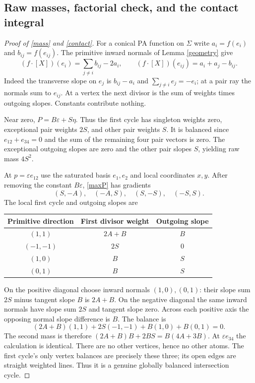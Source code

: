 \documentclass[11pt]{article}
\newcommand{\eps}{\varepsilon}
\begin{document}
\subsection{Raw masses, factorial check, and the contact integral}
\begin{proof}[Proof of \eqref{mass} and \eqref{contact}]
For a conical PA function on $\Sigma$ write $a_i=f(e_i)$ and $b_{ij}=f(e_{ij})$. The primitive inward normals of Lemma \ref{geometry} give
\begin{equation}\label{fanweights}
 (f\cdot[X])(e_i)=\sum_{j\ne i}b_{ij}-2a_i,\qquad
 (f\cdot[X])(e_{ij})=a_i+a_j-b_{ij}.
\end{equation}
Indeed the transverse slope on $e_j$ is $b_{ij}-a_i$ and $\sum_{j\ne i}e_j=-e_i$; at a pair ray the normals sum to $e_{ij}$. At a vertex the next divisor is the sum of weights times outgoing slopes. Constants contribute nothing.

Near zero, $P=B\eps+S\eta$. Thus the first cycle has singleton weights zero, exceptional pair weights $2S$, and other pair weights $S$. It is balanced since $e_{12}+e_{34}=0$ and the sum of the remaining four pair vectors is zero. The exceptional outgoing slopes are zero and the other pair slopes $S$, yielding raw mass $4S^2$.

At $p=\eps e_{12}$ use the saturated basis $e_1,e_2$ and local coordinates $x,y$. After removing the constant $B\eps$, \eqref{maxP} has gradients
\[(S,-A),\quad(-A,S),\quad(S,-S),\quad(-S,S).\]
The local first cycle and outgoing slopes are
\begin{center}
\begin{tabular}{ccc}\toprule
Primitive direction&First divisor weight&Outgoing slope\\\midrule
$(1,1)$&$2A+B$&$B$\\
$(-1,-1)$&$2S$&$0$\\
$(1,0)$&$B$&$S$\\
$(0,1)$&$B$&$S$\\\bottomrule
\end{tabular}
\end{center}
On the positive diagonal choose inward normals $(1,0),(0,1)$: their slope sum $2S$ minus tangent slope $B$ is $2A+B$. On the negative diagonal the same inward normals have slope sum $2S$ and tangent slope zero. Across each positive axis the opposing normal slope difference is $B$. The balance is
\[(2A+B)(1,1)+2S(-1,-1)+B(1,0)+B(0,1)=0.\]
The second mass is therefore $(2A+B)B+2BS=B(4A+3B)$. At $\eps e_{34}$ the calculation is identical. There are no other vertices, hence no other atoms. The first cycle's only vertex balances are precisely these three; its open edges are straight weighted lines. Thus it is a genuine globally balanced intersection cycle.


\end{proof}
\end{document}
